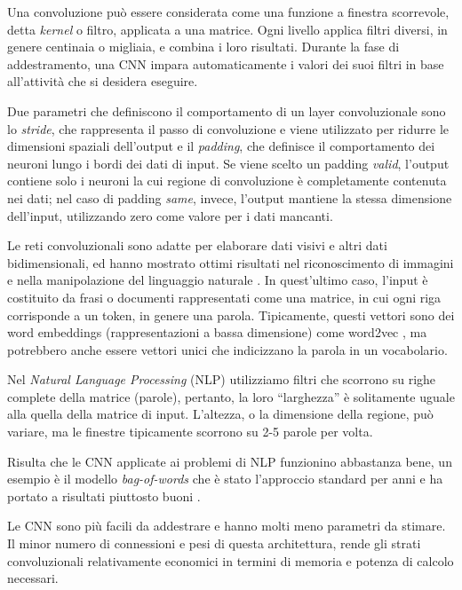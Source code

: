 Una convoluzione può essere considerata come una funzione a finestra scorrevole, detta \emph{kernel} o filtro, applicata a una matrice. 
Ogni livello applica filtri diversi, in genere centinaia o migliaia, e combina i loro risultati. 
Durante la fase di addestramento, una CNN impara automaticamente i valori dei suoi filtri in base all'attività che si desidera eseguire. 


Due parametri che definiscono il comportamento di un layer convoluzionale sono lo \emph{stride}, che rappresenta il passo di 
convoluzione e viene utilizzato per ridurre le dimensioni spaziali dell'output e il \emph{padding}, che definisce il comportamento dei neuroni lungo 
i bordi dei dati di input. Se viene scelto un padding \emph{valid}, l'output contiene solo i neuroni la cui regione di convoluzione è completamente contenuta nei dati; nel caso di padding \emph{same}, invece, l'output mantiene la stessa dimensione dell'input, utilizzando zero come valore per i dati mancanti.

Le reti convoluzionali sono adatte per elaborare dati visivi e altri dati bidimensionali, ed hanno mostrato ottimi risultati nel riconoscimento di immagini e nella manipolazione del linguaggio naturale \cite{manning1999foundations}.
In quest'ultimo caso, l'input è costituito da frasi o documenti rappresentati come una matrice, in cui ogni riga corrisponde a un token, in genere una parola. Tipicamente, questi vettori sono dei word embeddings (rappresentazioni a bassa dimensione) come word2vec \cite{mikolov2013distributed}, ma potrebbero anche essere vettori unici che indicizzano la parola in un vocabolario. 

Nel \emph{Natural Language Processing} (NLP) utilizziamo filtri che scorrono su righe complete della matrice (parole), pertanto, la loro ``larghezza'' è solitamente uguale alla quella della matrice di input. L'altezza, o la dimensione della regione, può variare, ma le finestre tipicamente scorrono su 2-5 parole per volta. 

Risulta che le CNN applicate ai problemi di NLP funzionino abbastanza bene, un esempio è il modello \emph{bag-of-words} che è stato l'approccio standard per anni e ha portato a risultati piuttosto buoni \cite{wallach2006topic}.

Le CNN sono più facili da addestrare e hanno molti meno parametri da stimare. 
Il minor numero di connessioni e pesi di questa architettura, rende gli strati convoluzionali relativamente economici in termini di memoria e potenza di calcolo necessari.

